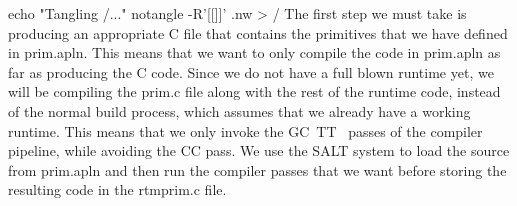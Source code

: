\documentclass{article}%
\begin{document}
\nwenddocs{}\plusendmoddef\nwstartdeflinemarkup{}\nwenddeflinemarkup
echo "Tangling /..."
notangle -R'[[]]' .nw > /
\eatline
{}\nwendcode{}\nwdocspar
The first step we must take is producing an appropriate C file that
contains the primitives that we have defined in {\Tt{}prim.apln\nwendquote}.
This means that we want to only compile the code in {\Tt{}prim.apln\nwendquote}
as far as producing the C code.
Since we do not have a full blown runtime yet,
we will be compiling the {\Tt{}prim.c\nwendquote} file along with the rest of the
runtime code,
instead of the normal build process,
which assumes that we already have a working runtime.
This means that we only invoke the {\Tt{}GC\ TT\ \nwendquote} passes of the
compiler pipeline, while avoiding the {\Tt{}CC\nwendquote} pass.
We use the SALT system to load the source from {\Tt{}prim.apln\nwendquote} and then
run the compiler passes that we want before storing the resulting
code in the {\Tt{}rtm{\nwbackslash}prim.c\nwendquote} file.
\end{document}
